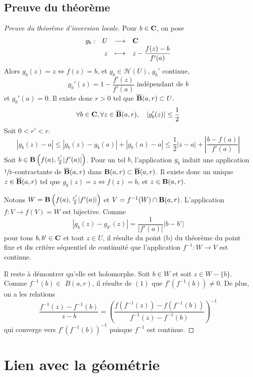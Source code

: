 \subsection{Preuve du théorème}

\begin{proof}[Preuve du théorème d'inversion locale]
Pour $b \in  \mathbf C$, on pose \[
\begin{array}{rrcl}
    g_b:& U & \longrightarrow & \mathbf C \\
        & z & \longmapsto & \displaystyle z- \frac{f(z)-b}{f'(a)}
\end{array}
\] 
Alors $g_b(z)=z \iff  f(z)=b$, et $g_b \in  \mathcal  H(U)$, $g_b'$ continue,  \[
    g_b'(z)=1-\frac{f'(z)}{f'(a)} \text{ indépendant de }b
\]
et $g_b'(a)=0$. Il existe donc $r>0$ tel que  $\overline{\mathbf B}(a, r)\subset U$. \[
    \forall  b \in  \mathbf C, \forall  z \in  \overline{\mathbf B}(a, r), \quad  |g_b'(z)|\leq \frac{1}{2}
\] 
Soit $0<r'<r$.  \[
    |g_b(z)-a|\leq |g_b(z)-g_b(a)|+|g_b(a)-a|\leq \frac{1}{2} |z-a|+ \left| \frac{b-f(a)}{f'(a)} \right|
\] 
Soit $b \in  \mathbf B \left(f(a), \frac{r'}2 |f'(a)|\right)$. Pour un tel $b$, l'application  $g_b$ induit une application $\sfrac{1}{2}$-contractante  de $\overline{\mathbf B}(a, r)$ dans $\mathbf B(a, r)\subset \overline{\mathbf B}(a, r)$.
Il existe donc un unique $z \in  \overline{\mathbf B}(a, r)$ tel que $g_b(z)=z \iff  f(z)=b$, et $z \in  \mathbf B(a, r)$.


Notons $W=\mathbf B \left(f(a), \frac{r'}2 |f'(a)|\right)$ et  $V=f^{-1}(W)\cap \mathbf B(a, r)$. L'application $f:V\longrightarrow f(V)=W$ est bijective. 
Comme
\[
\left|g_{b}(z)-g_{b'}(z)\right|=\frac{1}{\left|f'(a)\right|}\left|b-b'\right|
\]
pour tous $b, b' \in \mathbf C$ et tout $z \in U$, il résulte du point (b) du théorème du point fixe et $\mathop{}\!\mathrm d u$ critère séquentiel de continuité que l'application $f^{-1}: W \rightarrow V$ est continue.

Il reste à démontrer qu'elle est holomorphe. Soit $b \in W$ et soit $z \in W-\{b\} .$ Comme $f^{-1}(b) \in$ $B(a, r)$, il résulte de $(1)$ que $f'\left(f^{-1}(b)\right) \neq 0 .$ De plus, on a les relations
\[
\frac{f^{-1}(z)-f^{-1}(b)}{z-b}=\left(\frac{f\left(f^{-1}(z)\right)-f\left(f^{-1}(b)\right)}{f^{-1}(z)-f^{-1}(b)}\right)^{-1}
\]
qui converge vers $f'\left(f^{-1}(b)\right)^{-1}$ puisque $f^{-1}$ est continue.
\end{proof}

\section{Lien avec la géométrie}

